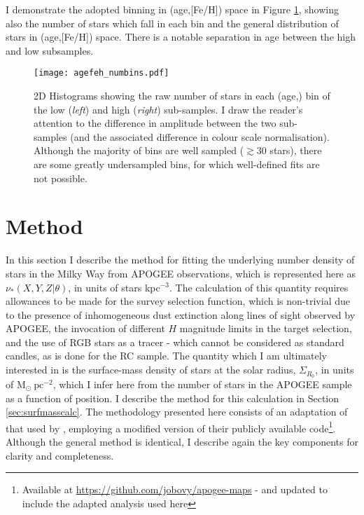 I demonstrate the adopted binning in (age,[Fe/H]) space in Figure \ref{fig:numbins}, showing also the number of stars which fall in each bin and the general distribution of stars in (age,[Fe/H]) space. There is a notable separation in age between the high and low \afe{} subsamples. 


 \begin{figure}
 	\texttt{[image: agefeh\_numbins.pdf]}
     \caption[2D Histogram demonstrating the number of stars in each age and \feh{} bin, in the high and low \afe{} populations, adopted for modelling the stellar density in the disk]{2D Histograms showing the raw number of stars in each (age,\feh{}) bin of the low (\emph{left}) and high (\emph{right}) \afe{} sub-samples. I draw the reader's attention to the difference in amplitude between the two sub-samples (and the associated difference in colour scale normalisation). Although the majority of bins are well sampled ($\gtrsim 30$ stars), there are some greatly undersampled bins, for which well-defined fits are not possible. }
    \label{fig:numbins}
 \end{figure}

 \section{Method}
 \label{sec:methoda}
 In this section I describe the method for fitting the underlying number density of stars in the Milky Way from APOGEE observations, which is represented here as $\nu_*(X,Y,Z|\theta)$, in units of stars kpc$^{-3}$. The calculation of this quantity requires allowances to be made for the survey selection function, which is non-trivial due to the presence of inhomogeneous dust extinction along lines of sight observed by APOGEE, the invocation of different $H$ magnitude limits in the target selection, and the use of RGB stars as a tracer - which cannot be considered as standard candles, as is done for the RC sample. The quantity which I am ultimately interested in is the surface-mass density of stars at the solar radius, $\Sigma_{R_0}$, in units of $\mathrm{M_{\odot}}\ \mathrm{pc^{-2}}$, which I infer here from the number of stars in the APOGEE sample as a function of position. I describe the method for this calculation in Section \ref{sec:surfmasscalc}. The methodology presented here consists of an adaptation of that used by \citet{2016ApJ...823...30B}, employing a modified version of their publicly available code\footnote{Available at \url{https://github.com/jobovy/apogee-maps} - and updated to include the adapted analysis used here}. Although the general method is identical, I describe again the key components for clarity and completeness.


